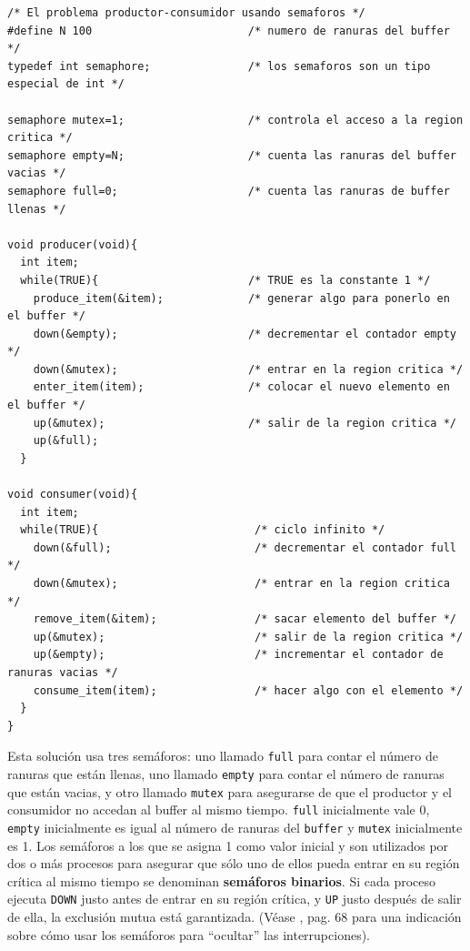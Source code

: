 \documentclass{article}
\begin{document}
\begin{verbatim}
/* El problema productor-consumidor usando semaforos */
#define N 100                        /* numero de ranuras del buffer */
typedef int semaphore;               /* los semaforos son un tipo especial de int */

semaphore mutex=1;                   /* controla el acceso a la region critica */
semaphore empty=N;                   /* cuenta las ranuras del buffer vacias */
semaphore full=0;                    /* cuenta las ranuras de buffer llenas */

void producer(void){
  int item;
  while(TRUE){                       /* TRUE es la constante 1 */
    produce_item(&item);             /* generar algo para ponerlo en el buffer */
    down(&empty);                    /* decrementar el contador empty */
    down(&mutex);                    /* entrar en la region critica */
    enter_item(item);                /* colocar el nuevo elemento en el buffer */
    up(&mutex);                      /* salir de la region critica */
    up(&full);
  }

void consumer(void){
  int item;
  while(TRUE){                        /* ciclo infinito */
    down(&full);                      /* decrementar el contador full */
    down(&mutex);                     /* entrar en la region critica */
    remove_item(&item);               /* sacar elemento del buffer */
    up(&mutex);                       /* salir de la region critica */
    up(&empty);                       /* incrementar el contador de ranuras vacias */
    consume_item(item);               /* hacer algo con el elemento */
  }
}
\end{verbatim}
Esta soluci\'on usa tres sem\'aforos: uno llamado {\tt full} para contar el n\'umero 
de ranuras que est\'an llenas, uno llamado {\tt empty} para contar el n\'umero de ranuras 
que est\'an vacias, y otro llamado {\tt mutex} para asegurarse de que el productor y el 
consumidor no accedan al buffer al mismo tiempo. {\tt full} inicialmente vale 0, 
{\tt empty} inicialmente es igual al n\'umero de ranuras del {\tt buffer} y {\tt mutex} 
inicialmente es 1. Los sem\'aforos a los que se asigna 1 como valor inicial y son 
utilizados por dos o m\'as procesos para asegurar que s\'olo uno de ellos pueda entrar 
en su regi\'on cr\'itica al mismo tiempo se denominan {\bf sem\'aforos binarios}. Si 
cada proceso ejecuta {\tt DOWN} justo antes de entrar en su regi\'on cr\'itica, y {\tt UP} 
justo despu\'es de salir de ella, la exclusi\'on mutua est\'a garantizada. (V\'ease 
\cite{Tanenbaum}, pag. 68 para una indicaci\'on sobre c\'omo usar los sem\'aforos 
para ``ocultar'' las interrupciones). 
\end{document}
